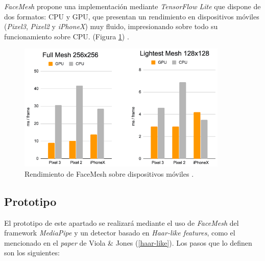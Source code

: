 \textit{FaceMesh} propone una implementación mediante \textit{TensorFlow Lite} que dispone de dos formatos: CPU y GPU, que presentan un rendimiento en dispositivos móviles (\textit{Pixel3}, \textit{Pixel2} y \textit{iPhoneX}) muy fluido, impresionando sobre todo su funcionamiento sobre CPU. (Figura \ref{fig:faceMeshRen}) \cite{faceMesh3}.

\begin{figure}[htp]
	\centering
	\includegraphics[width=10cm]{imagenes/rendFaceMesh.png}
	\caption{Rendimiento de FaceMesh sobre dispositivos móviles \cite{faceMesh3}.}
	\label{fig:faceMeshRen}
\end{figure}

\vspace{-0.8cm}
\subsection*{Prototipo}
\vspace{-0.5cm}
El prototipo de este apartado se realizará mediante el uso de \textit{FaceMesh} del framework \textit{MediaPipe} y un detector basado en \textit{Haar-like features}, como el mencionado en el \textit{paper} de Viola \& Jones (\ref{haar-like}). Los pasos que lo definen son los siguientes:

